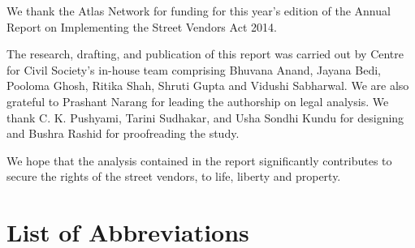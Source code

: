 \documentclass[a4paper, 12pt, twoside]{article}
\begin{document}
We thank the Atlas Network for funding for this year’s edition of the Annual Report on Implementing the Street Vendors Act 2014.

The research, drafting, and publication of this report was carried out by Centre for Civil Society’s in-house team comprising Bhuvana Anand, Jayana Bedi, Pooloma Ghosh, Ritika Shah, Shruti Gupta and Vidushi Sabharwal. We are also grateful to Prashant Narang for leading the authorship on legal analysis. We thank C. K. Pushyami, Tarini Sudhakar, and Usha Sondhi Kundu for designing and Bushra Rashid for proofreading the study.

We hope that the analysis contained in the report significantly contributes to secure the rights of the street vendors, to life, liberty and property.

\newpage
\tableofcontents

\newpage
{}

\section*{List of Abbreviations}
\end{document}
